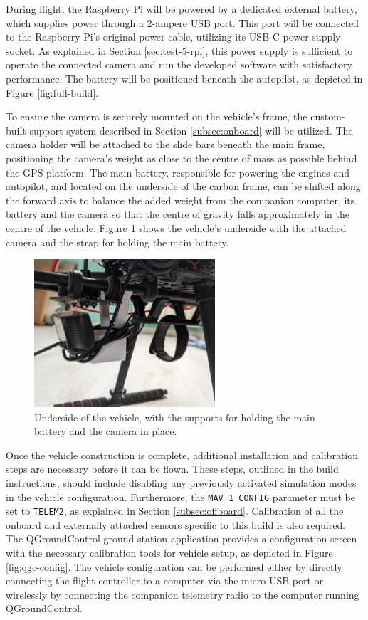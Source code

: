 During flight, the Raspberry Pi will be powered by a dedicated external battery, which supplies power through a 2-ampere USB port. This port will be connected to the Raspberry Pi's original power cable, utilizing its USB-C power supply socket. As explained in Section \ref{sec:test-5-rpi}, this power supply is sufficient to operate the connected camera and run the developed software with satisfactory performance. The battery will be positioned beneath the autopilot, as depicted in Figure \ref{fig:full-build}. 


To ensure the camera is securely mounted on the vehicle's frame, the custom-built support system described in Section \ref{subsec:onboard} will be utilized. The camera holder will be attached to the slide bars beneath the main frame, positioning the camera's weight as close to the centre of mass as possible behind the GPS platform. The main battery, responsible for powering the engines and autopilot, and located on the underside of the carbon frame, can be shifted along the forward axis to balance the added weight from the companion computer, its battery and the camera so that the centre of gravity falls approximately in the centre of the vehicle. Figure \ref{fig:camera-holder-closeup} shows the vehicle's underside with the attached camera and the strap for holding the main battery.

\begin{figure}[H]
  \centering
  \includegraphics[width=0.6\textwidth, keepaspectratio]{img/underside-2.jpg}
  \caption{Underside of the vehicle, with the supports for holding the main battery and the camera in place.}
  \label{fig:camera-holder-closeup}
\end{figure}


Once the vehicle construction is complete, additional installation and calibration steps are necessary before it can be flown. These steps, outlined in the build instructions, should include disabling any previously activated simulation modes in the vehicle configuration. Furthermore, the \texttt{MAV\_1\_CONFIG} parameter must be set to \texttt{TELEM2}, as explained in Section \ref{subsec:offboard}. Calibration of all the onboard and externally attached sensors specific to this build is also required. The QGroundControl ground station application provides a configuration screen with the necessary calibration tools for vehicle setup, as depicted in Figure \ref{fig:qgc-config}. The vehicle configuration can be performed either by directly connecting the flight controller to a computer via the micro-USB port or wirelessly by connecting the companion telemetry radio to the computer running QGroundControl.



